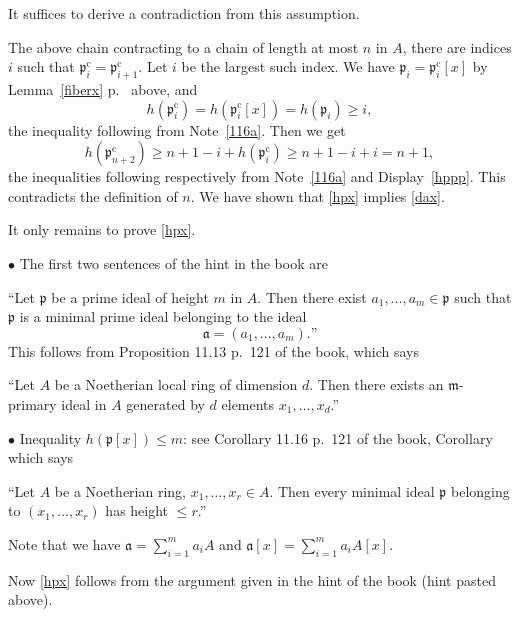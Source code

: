 \documentclass[parskip=half,fontsize=12pt]{scrartcl}%
\newcommand{\oo}{\operatorname}\newcommand{\ooo}{\operatorname*}
\newcommand{\mf}{\mathfrak}
\newcommand{\aaa}{\mf a}
\newcommand{\mmm}{\mf m}
\newcommand{\ppp}{\mf p}
\begin{document}
It suffices to derive a contradiction from this assumption. 

The above chain contracting to a chain of length at most $n$ in $A$, there are indices $i$ such that $\ppp_i^{\oo c}=\ppp_{i+1}^{\oo c}$. Let $i$ be the largest such index. We have $\ppp_i=\ppp_i^{\oo c}[x]$ by Lemma~\ref{fiberx} p.~\pageref{fiberx} above, and 
\begin{equation}\label{hppp}
h(\ppp_i^{\oo c})=h(\ppp_i^{\oo c}[x])=h(\ppp_i)\ge i,
\end{equation}
the inequality following from Note~\ref{116a}.%
Then we get 
$$
h(\ppp_{n+2}^{\oo c})\ge n+1-i+h(\ppp_i^{\oo c})\ge n+1-i+i=n+1,
$$ 
the inequalities following respectively from Note~\ref{116a} and Display~\eqref{hppp}. This contradicts the definition of $n$. We have shown that \eqref{hpx} implies \eqref{dax}. 

It only remains to prove \eqref{hpx}.

$\bullet$ The first two sentences of the hint in the book are 

``Let $\ppp$ be a prime ideal of height $m$ in $A$. Then there exist $a_1,\ldots,a_m\in\ppp$ such that $\ppp$ is a minimal prime ideal belonging to the ideal 
$$
\aaa=(a_1,\ldots,a_m).\text{''}
$$ 
This follows from Proposition 11.13 p.~121 of the book, which says 

``Let $A$ be a Noetherian local ring of dimension $d$. Then there exists an $\mmm$-primary ideal in $A$ generated by $d$ elements $x_1,\ldots,x_d$.'' %

$\bullet$ Inequality $h(\ppp[x])\le m$: see Corollary 11.16 p.~121 of the book, Corollary which says 

``Let $A$ be a Noetherian ring, $x_1,\ldots,x_r\in A$. Then every minimal ideal $\ppp$ belonging to $(x_1,\ldots,x_r)$ has height $\le r$.''

Note that we have $\aaa=\sum_{i=1}^ma_iA$ and $\aaa[x]=\sum_{i=1}^ma_iA[x]$.

Now \eqref{hpx} follows from the argument given in the hint of the book (hint pasted above).
\end{document}
